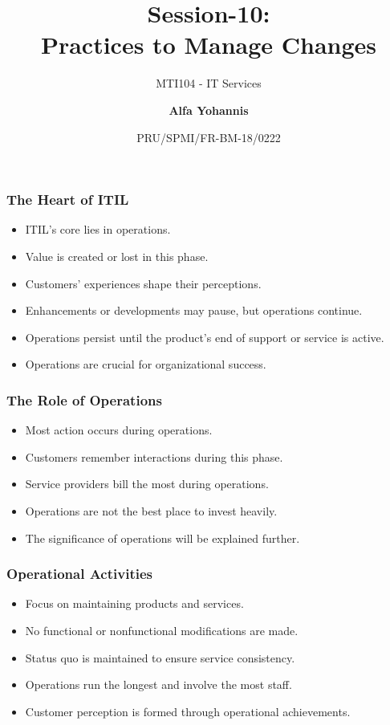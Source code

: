 \documentclass[aspectratio=169, table]{beamer}
\subtitle{MTI104 - IT Services}
\title{Session-10:\\\LARGE{Practices to Manage Changes\\}}
\date[Serial]{\scriptsize {PRU/SPMI/FR-BM-18/0222}}
\author[Pradita]{\small{\textbf{Alfa Yohannis}}}
\begin{document}
\frame{\titlepage}

\begin{frame}
	\frametitle{The Heart of ITIL}
	
	\begin{itemize}
		\item ITIL's core lies in operations.
		\item Value is created or lost in this phase.
		\item Customers' experiences shape their perceptions.
		\item Enhancements or developments may pause, but operations continue.
		\item Operations persist until the product’s end of support or service is active.
		\item Operations are crucial for organizational success.
	\end{itemize}
\end{frame}

\begin{frame}
	\frametitle{The Role of Operations}
	
	\begin{itemize}
		\item Most action occurs during operations.
		\item Customers remember interactions during this phase.
		\item Service providers bill the most during operations.
		\item Operations are not the best place to invest heavily.
		\item The significance of operations will be explained further.
	\end{itemize}
\end{frame}

\begin{frame}
	\frametitle{Operational Activities}
	
	\begin{itemize}
		\item Focus on maintaining products and services.
		\item No functional or nonfunctional modifications are made.
		\item Status quo is maintained to ensure service consistency.
		\item Operations run the longest and involve the most staff.
		\item Customer perception is formed through operational achievements.
	\end{itemize}
\end{frame}
\end{document}
